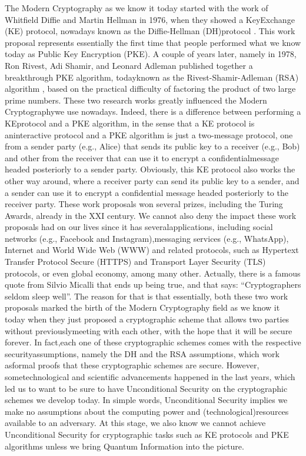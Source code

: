 \documentclass[12pt]{article}
\begin{document}
    The Modern Cryptography as we know it today started with the work of Whitfield Diffie and Martin Hellman in 1976, when they showed a Key\break Exchange (KE) protocol, nowadays known as the Diffie-Hellman (DH)\break protocol \cite{merkle:secure-communications-over-insecure-channels:1975:03-2024,diffie-hellman:new-directions-cryptography:1976:03-2024}. This work proposal represents essentially the first time that people performed what we know today as Public Key Encryption (PKE). A couple of years later, namely in 1978, Ron Rivest, Adi Shamir, and Leonard Adleman published together a breakthrough PKE algorithm, today\break known as the Rivest-Shamir-Adleman (RSA) algorithm \cite{rivest-shamir-adleman:method-obtaining-digital-signatures-public-key-cryptosystems:1978:03-2024}, based on the practical difficulty of factoring the product of two large prime numbers. These two research works greatly influenced the Modern Cryptography\break we use nowadays. Indeed, there is a difference between performing a KE\break protocol and a PKE algorithm, in the sense that a KE protocol is an\break interactive protocol and a PKE algorithm is just a two-message protocol, one from a sender party (e.g., Alice) that sends its public key to a receiver (e.g., Bob) and other from the receiver that can use it to encrypt a confidential\break message headed posteriorly to a sender party. Obviously, this KE protocol also works the other way around, where a receiver party can send its public key to a sender, and a sender can use it to encrypt a confidential message headed posteriorly to the receiver party. These work proposals won several prizes, including the Turing Awards, already in the XXI century. We cannot also deny the impact these work proposals had on our lives since it has several\break applications, including social networks (e.g., Facebook and Instagram),\break messaging services (e.g., WhatsApp), Internet and World Wide Web (WWW) and related protocols, such as Hypertext Transfer Protocol Secure (HTTPS) and Transport Layer Security (TLS) protocols, or even global economy, among many other. Actually, there is a famous quote from Silvio Micalli that ends up being true, and that says: ``Cryptographers seldom sleep well''. The reason for that is that essentially, both these two work proposals marked the birth of the Modern Cryptography field as we know it today when they just proposed a cryptographic scheme that allows two parties without previously\break meeting with each other, with the hope that it will be secure forever. In fact,\break each one of these cryptographic schemes comes with the respective security\break assumptions, namely the DH and the RSA assumptions, which work as\break formal proofs that these cryptographic schemes are secure. However, some\break technological and scientific advancements happened in the last years, which led us to want to be sure to have Unconditional Security on the cryptographic schemes we develop today. In simple words, Unconditional Security implies we make no assumptions about the computing power and (technological)\break resources available to an adversary. At this stage, we also know we cannot achieve Unconditional Security for cryptographic tasks such as KE protocols and PKE algorithms unless we bring Quantum Information into the picture.
\end{document}
